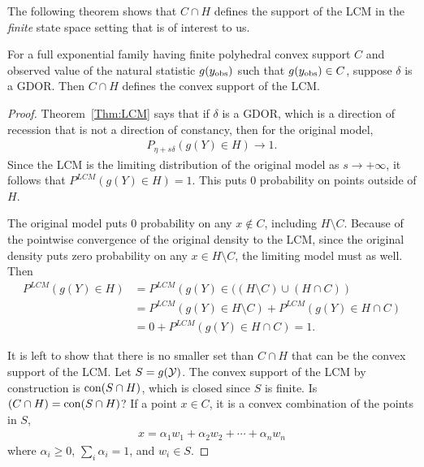 The following theorem shows that $C \cap H$ defines the support of the LCM 
in the \emph{finite} state space setting that is of interest to us.  
\begin{theorem} \label{Thm:C-H}
For a full exponential family having finite polyhedral convex support $C$ and observed value 
of the natural statistic $g(y_{\text{obs}})$ such that $g(y_{\text{obs}}) \in C$, suppose $\delta$ is a GDOR.
Then $C \cap H$ defines the convex support of the LCM.
\end{theorem}
\begin{proof}
Theorem~\ref{Thm:LCM} says that if $\delta$ is a GDOR, which is a direction of recession
that is not a direction of constancy, then for the original model,
\begin{align*}
	P_{\eta+s\delta}( g(Y) \in H ) \to 1.
\end{align*}
Since the LCM is the limiting distribution of the original model as $s \to +\infty$, it follows that $P^{LCM}(g(Y) \in H) = 1$.  
This puts 0 probability on points outside of $H$.  

The original model puts 0 probability on any $x \notin C$, including $H \setminus C$.  Because of the pointwise convergence of the original density to the LCM, since the original density puts zero probability on any $x \in H \setminus C$, the limiting model must as well.  Then
\begin{align*}
	P^{LCM}(g(Y) \in H) &= P^{LCM} \left( g(Y) \in ( (H \setminus C)  \cup (H \cap C)   \right ) \\
	 			&= P^{LCM} \left( g(Y) \in H \setminus C \right) 
								+ P^{LCM} \left( g(Y) \in H \cap C \right ) \\
	 			&= 0 + P^{LCM} \left( g(Y) \in H \cap C  \right ) = 1.
\end{align*}

It is left to show that there is no smaller set than $C \cap H$ that 
can be the convex support of the LCM.
Let $S = g({\mathcal Y})$.  The convex support of the LCM by construction is $\operatorname{con}(S \cap H)$, 
which is closed since $S$ is finite.  
Is $(C \cap H) = \operatorname{con}(S \cap H)$?
If a point $x \in C$, it is a convex combination of the points in $S$,
\begin{align*}
	x = \alpha_1 w_1 + \alpha_2 w_2 + \cdots + \alpha_n w_n
\end{align*}
where $\alpha_i \geq 0$, $\sum_i \alpha_i = 1$, and $w_i \in S$.


\end{proof}
